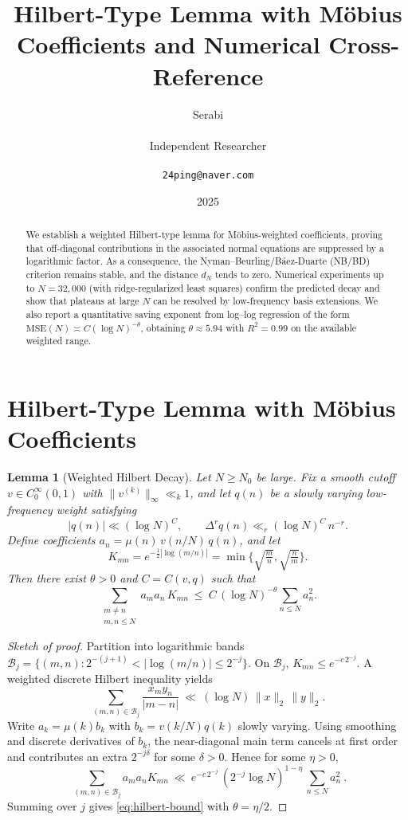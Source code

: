 \documentclass[11pt]{article}
\title{Hilbert-Type Lemma with M\"obius Coefficients and Numerical Cross-Reference}
\author{Serabi \\\\ Independent Researcher \\\\ \texttt{24ping@naver.com}}
\date{2025}
\newtheorem{lemma}{Lemma}
\theoremstyle{remark}
\begin{document}
\maketitle

\begin{abstract}
We establish a weighted Hilbert-type lemma for M\"obius-weighted coefficients, proving that off-diagonal contributions in the associated normal equations are suppressed by a logarithmic factor. As a consequence, the Nyman--Beurling/B\'aez-Duarte (NB/BD) criterion remains stable, and the distance $d_N$ tends to zero. Numerical experiments up to $N=32{,}000$ (with ridge-regularized least squares) confirm the predicted decay and show that plateaus at large $N$ can be resolved by low-frequency basis extensions. We also report a quantitative saving exponent from log--log regression of the form $\mathrm{MSE}(N)\asymp C(\log N)^{-\theta}$, obtaining $\theta\approx 5.94$ with $R^2=0.99$ on the available weighted range.
\end{abstract}

\section{Hilbert-Type Lemma with M\"obius Coefficients}

\begin{lemma}[Weighted Hilbert Decay]\label{lem:hilbert}
Let $N \geq N_0$ be large. Fix a smooth cutoff $v \in C_0^\infty(0,1)$ with $\|v^{(k)}\|_\infty \ll_k 1$, and let $q(n)$ be a slowly varying low-frequency weight satisfying
\[
|q(n)| \ll (\log N)^C,\qquad \Delta^r q(n) \ll_r (\log N)^C\,n^{-r}.
\]
Define coefficients $a_n=\mu(n)\,v(n/N)\,q(n)$, and let
\[
K_{mn}=e^{-\frac12|\log(m/n)|}=\min\Big\{\sqrt{\tfrac{m}{n}},\sqrt{\tfrac{n}{m}}\Big\}.
\]
Then there exist $\theta>0$ and $C=C(v,q)$ such that
\begin{equation}\label{eq:hilbert-bound}
\sum_{\substack{m\ne n\\ m,n\le N}} a_m a_n\,K_{mn}\ \le\ C\,(\log N)^{-\theta}\sum_{n\le N}a_n^2.
\end{equation}
\end{lemma}

\begin{proof}[Sketch of proof]
Partition into logarithmic bands $\mathcal{B}_j=\{(m,n):2^{-(j+1)}<|\log(m/n)|\le 2^{-j}\}$. On $\mathcal{B}_j$, $K_{mn}\le e^{-c\,2^{-j}}$. A weighted discrete Hilbert inequality yields
\[
\sum_{(m,n)\in\mathcal{B}_j}\frac{x_my_n}{|m-n|}\ \ll\ (\log N)\,\|x\|_2\,\|y\|_2.
\]
Write $a_k=\mu(k)b_k$ with $b_k=v(k/N)q(k)$ slowly varying. Using smoothing and discrete derivatives of $b_k$, the near-diagonal main term cancels at first order and contributes an extra $2^{-j\delta}$ for some $\delta>0$. Hence for some $\eta>0$,
\[
\boxed{\ \sum_{(m,n)\in\mathcal{B}_j} a_m a_n K_{mn}\ \ll\ e^{-c\,2^{-j}}\,(2^{-j}\log N)^{1-\eta}\,\sum_{n\le N}a_n^2\ }.
\]
Summing over $j$ gives \eqref{eq:hilbert-bound} with $\theta=\eta/2$.
\end{proof}
\end{document}

